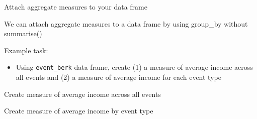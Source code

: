 \documentclass[8pt,ignorenonframetext,dvipsnames]{beamer}
\newenvironment{Shaded}{\begin{snugshade}}{\end{snugshade}}
\newcommand{\KeywordTok}[1]{\textcolor[rgb]{0.13,0.29,0.53}{\textbf{#1}}}
\newcommand{\DataTypeTok}[1]{\textcolor[rgb]{0.13,0.29,0.53}{#1}}
\newcommand{\DecValTok}[1]{\textcolor[rgb]{0.00,0.00,0.81}{#1}}
\newcommand{\StringTok}[1]{\textcolor[rgb]{0.31,0.60,0.02}{#1}}
\newcommand{\CommentTok}[1]{\textcolor[rgb]{0.56,0.35,0.01}{\textit{#1}}}
\newcommand{\OtherTok}[1]{\textcolor[rgb]{0.56,0.35,0.01}{#1}}
\newcommand{\OperatorTok}[1]{\textcolor[rgb]{0.81,0.36,0.00}{\textbf{#1}}}
\newcommand{\NormalTok}[1]{#1}
\providecommand{\tightlist}{%
  \setlength{\itemsep}{0pt}\setlength{\parskip}{0pt}}
\renewcommand{\textbf}[1]{{\color{darkgray}\bfseries\fontfamily{Montserrat-TOsF}#1}}
\begin{document}
\begin{frame}[fragile]{Attach aggregate measures to your data frame}

We can attach aggregate measures to a data frame by using group\_by
without summarise()

Example task:

\begin{itemize}
\tightlist
\item
  Using \texttt{event\_berk} data frame, create (1) a measure of average
  income across all events and (2) a measure of average income for each
  event type
\end{itemize}

Create measure of average income across all events

\begin{Shaded}
\end{Shaded}

Create measure of average income by event type

\begin{Shaded}
\end{Shaded}

\end{frame}
\end{document}
